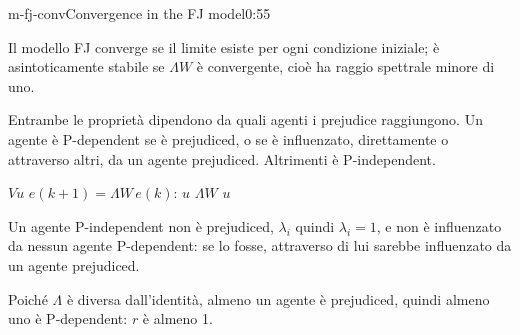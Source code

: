 \begin{slide}{m-fj-conv}{Convergence in the FJ model}{0:55 {\color{red}}}
  \begin{discorso}
    \item Il modello FJ converge se il limite esiste per ogni condizione iniziale; è asintoticamente stabile se $\Lambda W$ è convergente, cioè ha raggio spettrale minore di uno.
    \item {\color{red}  } {\color{blue}Entrambe le proprietà dipendono da quali agenti i prejudice raggiungono. Un} agente è P-dependent se è prejudiced, o se è influenzato, direttamente o attraverso altri, da un agente prejudiced. Altrimenti è P-independent.
    \item {\color{red}                                  }
    \item {\color{red}     } {\color{red}$Vu$} {\color{red} } {\color{red}$e(k+1)=\Lambda W\,e(k)$:} {\color{red}$u$} {\color{red}  } {\color{red}$\Lambda W$} {\color{red}    } {\color{red}$u$} {\color{red} }
    \item Un agente {\color{blue}P-independent non è} prejudiced, {\color{red}      } {\color{red}$\lambda_i$} {\color{red}        } {\color{blue}quindi $\lambda_i=1$, e non è influenzato da nessun agente P-dependent:} se {\color{red}  } {\color{blue}lo fosse, attraverso di lui sarebbe} influenzato da un agente prejudiced.
    \item {\color{blue}Poiché $\Lambda$ è diversa dall'identità, almeno un agente è prejudiced, quindi almeno uno è P-dependent: $r$ è almeno 1.}

\end{discorso}
\end{slide}
